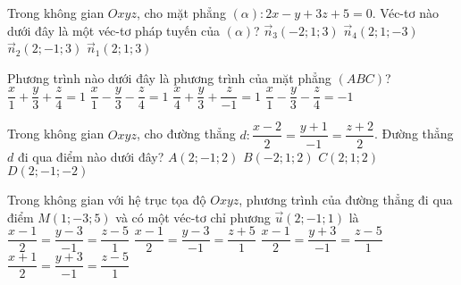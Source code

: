 \begin{ex}%
	Trong không gian $Oxyz$, cho mặt phẳng $\left(\alpha\right)\colon 2x-y+3z+5=0$. Véc-tơ nào dưới đây là một véc-tơ pháp tuyến của $\left(\alpha\right)$?
	\choice
	{$\overrightarrow{n}_3\left(-2;1;3\right)$}
	{$\overrightarrow{n}_4\left(2;1;-3\right)$}
	{\True $\overrightarrow{n}_2\left(2;-1;3\right)$}
	{$\overrightarrow{n}_1\left(2;1;3\right)$}
\end{ex}

\begin{ex}%
	Phương trình nào dưới đây là phương trình của mặt phẳng $(ABC)$?
	\choice
	{$\dfrac{x}{1}+\dfrac{y}{3}+\dfrac{z}{4}=1$}
	{$\dfrac{x}{1}-\dfrac{y}{3}-\dfrac{z}{4}=1$}
	{$\dfrac{x}{4}+\dfrac{y}{3}+\dfrac{z}{-1}=1$}
	{\True $\dfrac{x}{1}-\dfrac{y}{3}-\dfrac{z}{4}=-1$}
\end{ex}

\begin{ex}%
	Trong không gian $Oxyz$, cho đường thẳng $d\colon  \dfrac{x-2}{2}=\dfrac{y+1}{-1}=\dfrac{z+2}{2}$. Đường thẳng $d$ đi qua điểm nào dưới đây?
	\choice
	{$A(2;-1; 2)$}
	{$B(-2; 1; 2)$}
	{$C(2; 1; 2)$}
	{\True $D(2;-1;-2)$}
\end{ex}

%

\begin{ex}%
	Trong không gian với hệ trục tọa độ $Oxyz$, phương trình của đường thẳng đi qua điểm $M(1;-3; 5)$ và có một véc-tơ chỉ phương $\overrightarrow{u}(2;-1; 1)$ là
	\choice
	{$\dfrac{x-1}{2}=\dfrac{y-3}{-1}=\dfrac{z-5}{1}$}
	{$\dfrac{x-1}{2}=\dfrac{y-3}{-1}=\dfrac{z+5}{1}$}
	{\True $\dfrac{x-1}{2}=\dfrac{y+3}{-1}=\dfrac{z-5}{1}$}
	{$\dfrac{x+1}{2}=\dfrac{y+3}{-1}=\dfrac{z-5}{1}$}
\end{ex}

